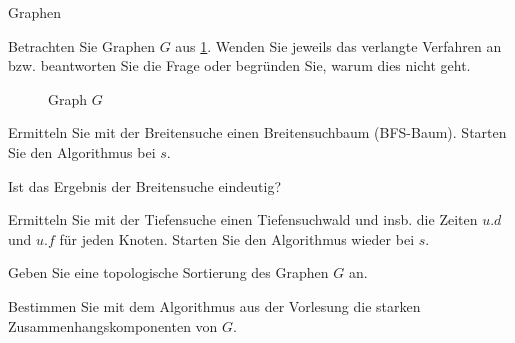 \documentclass{exercisesheet}
\begin{document}
\begin{eexercises}{Graphen}{
    Betrachten Sie Graphen $G$ aus \ref{fig:simplegraph}. Wenden Sie jeweils das verlangte Verfahren an bzw. beantworten Sie die Frage oder begründen Sie, warum dies nicht geht.
    \begin{figure}[ht]
      \caption{Graph $G$}
      \label{fig:simplegraph}
      \centering
    \end{figure}
  }
  \item Ermitteln Sie mit der Breitensuche einen Breitensuchbaum (BFS-Baum). Starten Sie den Algorithmus bei $s$.
  \item Ist das Ergebnis der Breitensuche eindeutig?
  \item Ermitteln Sie mit der Tiefensuche einen Tiefensuchwald und insb. die Zeiten $u.d$ und $u.f$ für jeden Knoten. Starten Sie den Algorithmus wieder bei $s$.
  \item Geben Sie eine topologische Sortierung des Graphen $G$ an.
  \item Bestimmen Sie mit dem Algorithmus aus der Vorlesung die starken Zusammenhangskomponenten von $G$.
\end{eexercises}
\end{document}
